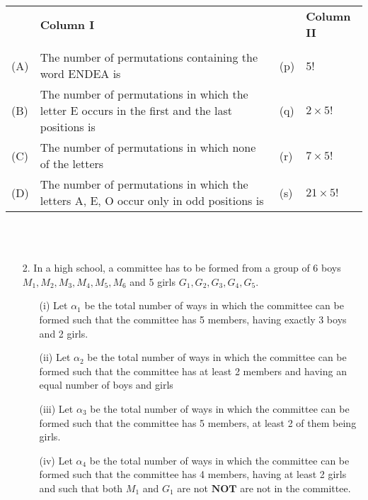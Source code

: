 \documentclass[journal,12pt,twocolumn]{IEEEtran}
\theoremstyle{remark}
\begin{document}
\begin{tabular}{p{0.5cm}p{9cm}p{1.5cm}p{2cm}}
& \textbf{Column I } & & \textbf{Column II}\\ \\
 (A) & The number of permutations containing the word ENDEA is & \raggedleft (p) & 5! \\
    (B) & The number of permutations in which the letter E occurs in the first and the last positions is & \raggedleft(q) & $2\times{5!}$\\
    (C)& The number of permutations in which none of the letters & \raggedleft (r) &$7\times{5!}$\\
    (D) & The number of permutations in which the letters A, E, O occur only in odd positions is & \raggedleft (s) & $21\times{5!}$
    
\end{tabular}
\\ \\
\begin{enumerate}
\item[2.] In a high school, a committee has to be formed from a group of 6 boys $M_1,M_2,M_3,M_4,M_5,M_6$ and 5 girls $G_1,G_2,G_3,G_4,G_5$.

\begin{enumerate}
    \item[(i)] Let $\alpha_1$ be the total number of ways in which the committee can be formed such that the committee has 5 members, having exactly 3 boys and 2 girls. 
    \item[(ii)] Let $\alpha_2$ be the total number of ways in which the committee can be formed such that the committee has at least 2 members and having an equal number of boys and girls
    \item[(iii)] Let $\alpha_3$ be the total number of ways in which the committee can be formed such that the committee has 5 members, at least 2 of them being girls. 
    \item[(iv)] Let $\alpha_4$ be the total number of ways in which the committee can be formed such that the committee has 4 members, having at least 2 girls and such that both $M_1$ and $G_1$ are not $\mathbf{NOT} $ are not in the committee. \\
\end{enumerate}

\end{enumerate}

    
\end{document}
